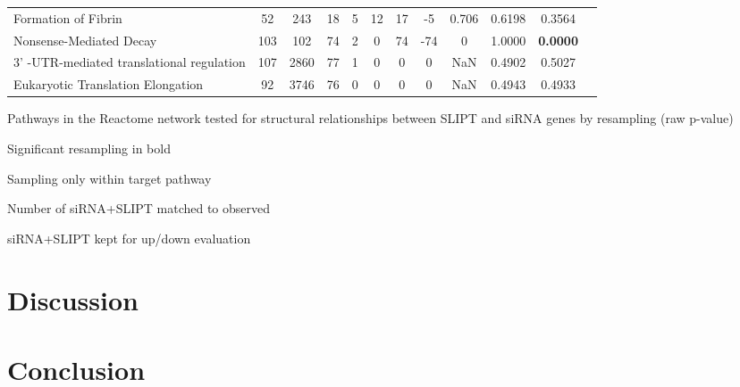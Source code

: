 \begin{table*}[!htb]
{{\begin{threeparttable}
\begin{tabular}{lccccccccccc}
\rowcolor{black!10}
Formation of Fibrin                       & 52          & 243          & 18            & 5           & 12   & 17   & -5      & 0.706        & 0.6198             & 0.3564              \\
\rowcolor{black!5}
Nonsense-Mediated Decay                   & 103         & 102          & 74            & 2           & 0    & 74   & -74     & 0            & 1.0000             & \textbf{0.0000}                   \\
\rowcolor{black!10}
3' -UTR-mediated translational regulation & 107         & 2860         & 77            & 1           & 0    & 0    & 0       & NaN          & 0.4902             & 0.5027              \\
\rowcolor{black!5}
Eukaryotic Translation Elongation         & 92          & 3746         & 76            & 0           & 0    & 0    & 0       & NaN          & 0.4943             & 0.4933              \\
\hline
\end{tabular}
\begin{tablenotes}
\raggedright \small
Pathways in the Reactome network tested for structural relationships between \gls{SLIPT} and \gls{siRNA} genes by resampling (raw p-value)

Significant resampling in bold

Sampling only within target pathway

Number of siRNA+SLIPT matched to observed

siRNA+SLIPT kept for up/down evaluation 
\end{tablenotes}
\end{threeparttable}
}
}
\end{table*}

\FloatBarrier

\section{Discussion}

\section{Conclusion}